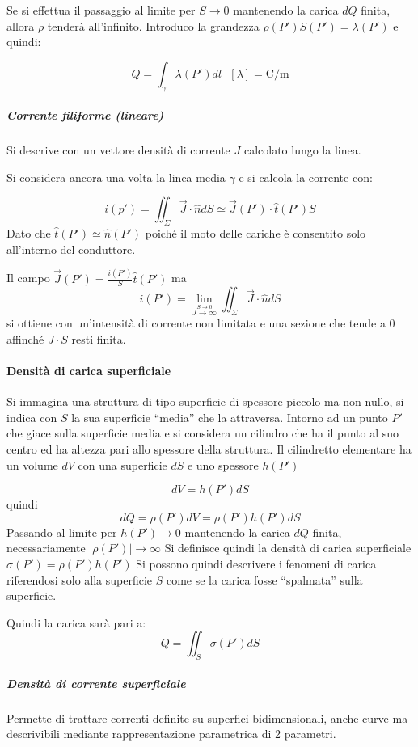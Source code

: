 Se si effettua il passaggio al limite per $S\to 0 $ mantenendo la carica $dQ$ finita, allora $\rho$
tenderà all'infinito.
Introduco la grandezza $\rho(P') S(P') = \lambda(P')$ e quindi:

$$
Q  = \int_\gamma \lambda(P') dl\ \ \ [\lambda] = \si{\coulomb/\meter}
$$
\subparagraph{Corrente filiforme (lineare)}

Si descrive con un vettore densità di corrente $J$ calcolato lungo la linea.

Si considera ancora una volta la linea media $\gamma$ e si calcola la corrente con:

$$
i(p') = \iint_\Sigma \vec{J}\cdot\hat{n}dS \simeq \vec{J}(P')\cdot\hat{t}(P')S
$$
Dato che $\hat{t}(P') \simeq \hat{n}(P')$ poiché il moto delle cariche è consentito solo 
all'interno del conduttore.

Il campo $\vec{J}(P') = \frac{i(P')}{S}\hat{t}(P')$ ma
$$
i(P') = \lim_{\stackrel{S\to 0}{J\to\infty}} \iint_\Sigma \vec{J}\cdot\hat{n}dS
$$
si ottiene con un'intensità di corrente non limitata e una sezione che tende a 0 affinché $J\cdot S$ 
resti finita.

\paragraph{Densità di carica superficiale}
Si immagina una struttura di tipo superficie di spessore piccolo ma non nullo, si indica con $S$ la
sua superficie ``media'' che la attraversa.
Intorno ad un punto $P'$ che giace sulla superficie media e si considera un cilindro che ha il
punto al suo centro ed ha altezza pari allo spessore della struttura.
Il cilindretto elementare ha un volume $dV$ con una superficie $dS$ e uno spessore $h(P')$

$$
dV = h(P') dS
$$
quindi
$$
dQ = \rho(P')dV = \rho(P')h(P')dS
$$
Passando al limite per $h(P') \to 0$ mantenendo la carica $dQ$ finita, necessariamente
$|\rho(P')| \to \infty$
Si definisce quindi la densità di carica superficiale $\sigma(P') = \rho(P')h(P')$
Si possono quindi descrivere i fenomeni di carica riferendosi solo alla superficie $S$
come se la carica fosse ``spalmata'' sulla superficie.

Quindi la carica sarà pari a:
$$
Q = \iint_S \sigma(P')dS
$$
\newpage
\subparagraph{Densità di corrente superficiale}
Permette di trattare correnti definite su superfici bidimensionali, anche curve ma descrivibili
mediante rappresentazione parametrica di 2 parametri.

